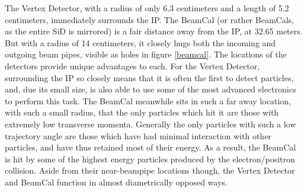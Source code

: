 \documentclass{report}
\begin{document}
                The Vertex Detector, with a radius of only 6.3 centimeters and a length of 5.2 centimeters, immediately surrounds the IP. The BeamCal (or rather BeamCals, as the entire SiD is mirrored) is a fair distance away from the IP, at 32.65 meters. But with a radius of 14 centimeters, it closely hugs both the incoming and outgoing beam pipes, visible as holes in figure \ref{beamcal}. The locations of the detectors provide unique advantages to each. For the Vertex Detector, surrounding the IP so closely means that it is often the first to detect particles, and, due its small size, is also able to use some of the most advanced electronics to perform this task. The BeamCal meanwhile sits in such a far away location, with such a small radius, that the only particles which hit it are those with extremely low transverse momenta. Generally the only particles with such a low trajectory angle are those which have had minimal interaction with other particles, and have thus retained most of their energy. As a result, the BeamCal is hit by some of the highest energy particles produced by the electron/positron collision. Aside from their near-beampipe locations though, the Vertex Detector and BeamCal function in almost diametrically opposed ways.
\end{document}
